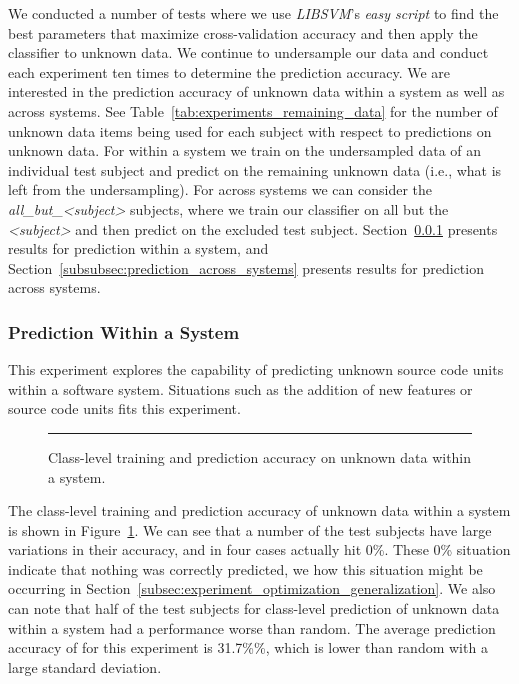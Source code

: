 We conducted a number of tests where we use \emph{LIBSVM}'s \emph{easy script} to find the best parameters that maximize cross-validation accuracy and then apply the classifier to unknown data. We continue to undersample our data and conduct each experiment ten times to determine the prediction accuracy. We are interested in the prediction accuracy of unknown data within a system as well as across systems. See Table~\ref{tab:experiments_remaining_data} for the number of unknown data items being used for each subject with respect to predictions on unknown data. For within a system we train on the undersampled data of an individual test subject and predict on the remaining unknown data (i.e., what is left from the undersampling). For across systems we can consider the \emph{all\_but\_<subject>} subjects, where we train our classifier on all but the \emph{<subject>} and then predict on the excluded test subject. Section~\ref{subsubsec:prediction_within_system} presents results for prediction within a system, and Section~\ref{subsubsec:prediction_across_systems} presents results for prediction across systems.


\subsubsection{Prediction Within a System}
\label{subsubsec:prediction_within_system}
This experiment explores the capability of predicting unknown source code units within a software system. Situations such as the addition of new features or source code units fits this experiment.

\begin{figure}[!tb]
  \centering
  \begin{adjustbox}{max size={\textwidth}{\textheight}}
    
  \end{adjustbox}
  \caption{Class-level training and prediction accuracy on unknown data within a system.}
  \vspace{2mm}
  \hrule
  \label{fig:prediction_class_within_graph}
\end{figure}

The class-level training and prediction accuracy of unknown data within a system is shown in Figure~\ref{fig:prediction_class_within_graph}. We can see that a number of the test subjects have large variations in their accuracy, and in four cases actually hit 0\%. These 0\% situation indicate that nothing was correctly predicted, we how this situation might be occurring in Section~\ref{subsec:experiment_optimization_generalization}. We also can note that half of the test subjects for class-level prediction of unknown data within a system had a performance worse than random. The average prediction accuracy of for this experiment is 31.7\%\%, which is lower than random with a large standard deviation.

